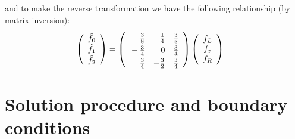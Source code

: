 \documentclass[10pt,a4paper]{article}
\begin{document}
and to make the reverse transformation we have the following relationship (by
matrix inversion):
\begin{align*}
\left( \begin{array}{c}
\hat{f}_0 \\ \hat{f}_1 \\ \hat{f}_2
\end{array} \right)
& = \left( \begin{array}{rrr}
\rule{0pt}{4mm} \frac{3}{8} & \frac{1}{4} & \frac{3}{8} \\
\rule{0pt}{4mm} -\frac{3}{4} & 0 & \frac{3}{4} \\
\rule{0pt}{4mm} \frac{3}{4} & -\frac{3}{2} & \frac{3}{4}
\end{array} \right)
\left( \begin{array}{c}
f_L \\ f_z \\ f_R
\end{array} \right)
\end{align*}

\newpage
\section{Solution procedure and boundary conditions}
\label{sec:solution}
\end{document}
